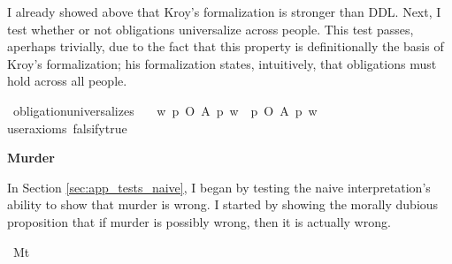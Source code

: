 \begin{isabellebody}
\begin{isamarkuptext}
        I already showed above that Kroy's formalization is stronger than DDL. Next, I test whether or
not obligations universalize across people. This test passes, aperhaps trivially, due to the fact that 
this property is definitionally the basis of Kroy's formalization; his formalization states, intuitively, 
that obligations must hold across all people.%
\end{isamarkuptext}\isamarkuptrue%
\isamarkupfalse%
\ obligation{\isacharunderscore}universalizes{\isacharcolon}\isanewline
\ \ \ {\isachardoublequoteopen}{\isasymforall}w{\isachardot}\ {\isacharparenleft}{\isasymexists}p{\isachardot}\ O\ {\isacharbraceleft}A\ p{\isacharbraceright}\ w{\isacharparenright}\ {\isasymlongrightarrow}\ {\isacharparenleft}{\isasymforall}p{\isachardot}\ O\ {\isacharbraceleft}A\ p{\isacharbraceright}\ w{\isacharparenright}{\isachardoublequoteclose}\isanewline
\ \ \isamarkupfalse%
{\isacharbrackleft}user{\isacharunderscore}axioms{\isacharcomma}\ falsify{\isacharequal}true{\isacharbrackright}%
\isadelimproof
\ %
\endisadelimproof
%
\isatagproof
{}\isamarkupfalse%
%
\endisatagproof
{\isafoldproof}%
%
\isadelimproof
%
\endisadelimproof
%
\begin{isamarkuptext}%
\noindent \textbf{Murder}%
\end{isamarkuptext}\isamarkuptrue%
%
\begin{isamarkuptext}%
In Section \ref{sec:app_tests_naive}, I began by testing the naive interpretation's ability to show that murder 
is wrong. I started by showing the morally dubious proposition that if murder is possibly wrong, then 
it is actually wrong.%
\end{isamarkuptext}\isamarkuptrue%
\isamarkupfalse%
\ M{\isacharcolon}{\isacharcolon}{\isachardoublequoteopen}t{\isachardoublequoteclose}\isanewline
%
\end{isabellebody}
